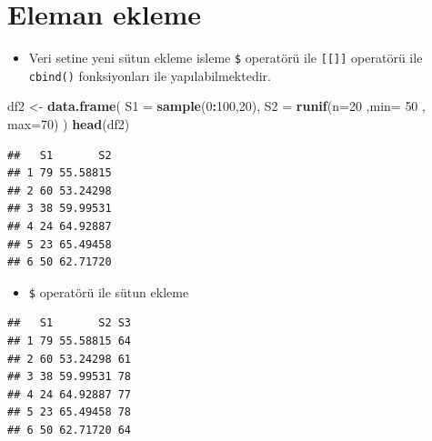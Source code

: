 \documentclass[
  oneside]{book}
\newenvironment{Shaded}{\begin{snugshade}}{\end{snugshade}}
\newcommand{\AttributeTok}[1]{\textcolor[rgb]{0.13,0.29,0.53}{#1}}
\newcommand{\ConstantTok}[1]{\textcolor[rgb]{0.56,0.35,0.01}{#1}}
\newcommand{\DecValTok}[1]{\textcolor[rgb]{0.00,0.00,0.81}{#1}}
\newcommand{\FunctionTok}[1]{\textcolor[rgb]{0.13,0.29,0.53}{\textbf{#1}}}
\newcommand{\NormalTok}[1]{#1}
\newcommand{\OtherTok}[1]{\textcolor[rgb]{0.56,0.35,0.01}{#1}}
\newcommand{\SpecialCharTok}[1]{\textcolor[rgb]{0.81,0.36,0.00}{\textbf{#1}}}
\providecommand{\tightlist}{%
  \setlength{\itemsep}{0pt}\setlength{\parskip}{0pt}}
\begin{document}
\hypertarget{eleman-ekleme}{%
\section{Eleman ekleme}\label{eleman-ekleme}}

\begin{itemize}
\tightlist
\item
  Veri setine yeni sütun ekleme isleme \texttt{\$} operatörü ile \texttt{{[}{[}{]}{]}} operatörü ile \texttt{cbind()} fonksiyonları ile yapılabilmektedir.
\end{itemize}

\begin{Shaded}
\begin{Highlighting}[]
\NormalTok{df2 }\OtherTok{\textless{}{-}} \FunctionTok{data.frame}\NormalTok{(}
      \AttributeTok{S1 =} \FunctionTok{sample}\NormalTok{(}\DecValTok{0}\SpecialCharTok{:}\DecValTok{100}\NormalTok{,}\DecValTok{20}\NormalTok{),}
      \AttributeTok{S2 =} \FunctionTok{runif}\NormalTok{(}\AttributeTok{n=}\DecValTok{20}\NormalTok{ ,}\AttributeTok{min=} \DecValTok{50}\NormalTok{ , }\AttributeTok{max=}\DecValTok{70}\NormalTok{)}
\NormalTok{)}
\FunctionTok{head}\NormalTok{(df2)}
\end{Highlighting}
\end{Shaded}

\begin{verbatim}
##   S1       S2
## 1 79 55.58815
## 2 60 53.24298
## 3 38 59.99531
## 4 24 64.92887
## 5 23 65.49458
## 6 50 62.71720
\end{verbatim}

\begin{itemize}
\tightlist
\item
  \texttt{\$} operatörü ile sütun ekleme
\end{itemize}

\begin{Shaded}
\end{Shaded}

\begin{verbatim}
##   S1       S2 S3
## 1 79 55.58815 64
## 2 60 53.24298 61
## 3 38 59.99531 78
## 4 24 64.92887 77
## 5 23 65.49458 78
## 6 50 62.71720 64
\end{verbatim}
\end{document}
